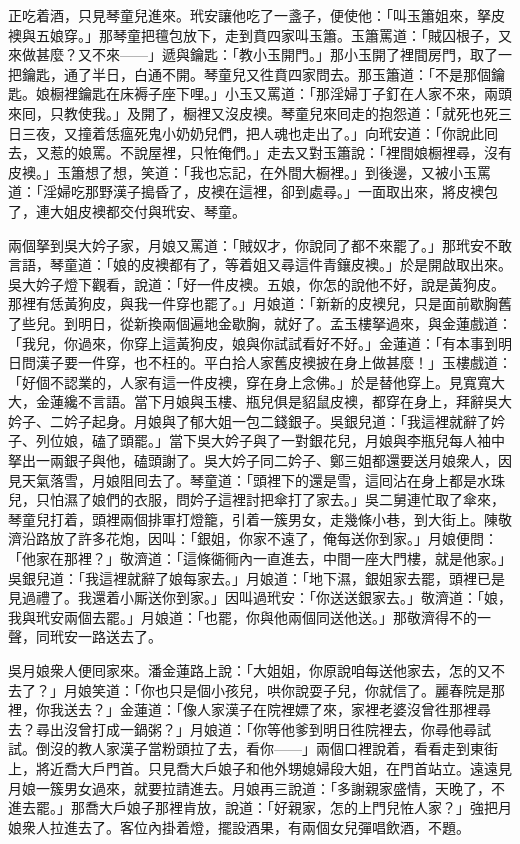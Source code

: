 正吃着酒，只見琴童兒進來。玳安讓他吃了一盞子，便使他：「叫玉簫姐來，拏皮襖與五娘穿。」那琴童把氊包放下，走到賁四家叫玉簫。玉簫罵道：「賊囚根子，又來做甚麼？又不來——」遞與鑰匙：「教小玉開門。」那小玉開了裡間房門，取了一把鑰匙，通了半日，白通不開。琴童兒又徃賁四家問去。那玉簫道：「不是那個鑰匙。娘橱裡鑰匙在床褥子座下哩。」小玉又罵道：「那淫婦丁子釘在人家不來，兩頭來囘，只教使我。」及開了，橱裡又沒皮襖。琴童兒來囘走的抱怨道：「就死也死三日三夜，又撞着恁瘟死鬼小奶奶兒們，把人魂也走出了。」向玳安道：「你說此囘去，又惹的娘罵。不說屋裡，只恠俺們。」走去又對玉簫說：「裡間娘橱裡尋，沒有皮襖。」玉簫想了想，笑道：「我也忘記，在外間大橱裡。」到後邊，又被小玉罵道：「淫婦吃那野漢子搗昏了，皮襖在這裡，卻到處尋。」一面取出來，將皮襖包了，連大姐皮襖都交付與玳安、琴童。

兩個拏到吳大妗子家，月娘又罵道：「賊奴才，你說同了都不來罷了。」那玳安不敢言語，琴童道：「娘的皮襖都有了，等着姐又尋這件青鑲皮襖。」於是開啟取出來。吳大妗子燈下觀看，說道：「好一件皮襖。五娘，你怎的說他不好，說是黃狗皮。那裡有恁黃狗皮，與我一件穿也罷了。」月娘道：「新新的皮襖兒，只是面前歇胸舊了些兒。到明日，從新換兩個遍地金歇胸，就好了。孟玉樓拏過來，與金蓮戲道：「我兒，你過來，你穿上這黃狗皮，娘與你試試看好不好。」金蓮道：「有本事到明日問漢子要一件穿，也不枉的。平白拾人家舊皮襖披在身上做甚麼！」玉樓戲道：「好個不認業的，人家有這一件皮襖，穿在身上念佛。」於是替他穿上。見寬寬大大，金蓮纔不言語。當下月娘與玉樓、瓶兒俱是貂鼠皮襖，都穿在身上，拜辭吳大妗子、二妗子起身。月娘與了郁大姐一包二錢銀子。吳銀兒道：「我這裡就辭了妗子、列位娘，磕了頭罷。」當下吳大妗子與了一對銀花兒，月娘與李瓶兒每人袖中拏出一兩銀子與他，磕頭謝了。吳大妗子同二妗子、鄭三姐都還要送月娘衆人，因見天氣落雪，月娘阻囘去了。琴童道：「頭裡下的還是雪，這囘沾在身上都是水珠兒，只怕濕了娘們的衣服，問妗子這裡討把傘打了家去。」吳二舅連忙取了傘來，琴童兒打着，頭裡兩個排軍打燈籠，引着一簇男女，走幾條小巷，到大街上。陳敬濟沿路放了許多花炮，因叫：「銀姐，你家不遠了，俺每送你到家。」月娘便問：「他家在那裡？」敬濟道：「這條衚衕內一直進去，中間一座大門樓，就是他家。」吳銀兒道：「我這裡就辭了娘每家去。」月娘道：「地下濕，銀姐家去罷，頭裡已是見過禮了。我還着小厮送你到家。」因叫過玳安：「你送送銀家去。」敬濟道：「娘，我與玳安兩個去罷。」月娘道：「也罷，你與他兩個同送他送。」那敬濟得不的一聲，同玳安一路送去了。

吳月娘衆人便囘家來。潘金蓮路上說：「大姐姐，你原說咱每送他家去，怎的又不去了？」月娘笑道：「你也只是個小孩兒，哄你說耍子兒，你就信了。麗春院是那裡，你我送去？」金蓮道：「像人家漢子在院裡嫖了來，家裡老婆沒曾徃那裡尋去？尋出沒曾打成一鍋粥？」月娘道：「你等他爹到明日徃院裡去，你尋他尋試試。倒沒的教人家漢子當粉頭拉了去，看你——」兩個口裡說着，看看走到東街上，將近喬大戶門首。只見喬大戶娘子和他外甥媳婦段大姐，在門首站立。遠遠見月娘一簇男女過來，就要拉請進去。月娘再三說道：「多謝親家盛情，天晚了，不進去罷。」那喬大戶娘子那裡肯放，說道：「好親家，怎的上門兒恠人家？」強把月娘衆人拉進去了。客位內掛着燈，擺設酒果，有兩個女兒彈唱飲酒，不題。

